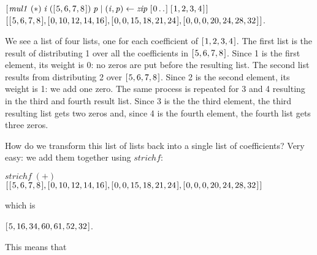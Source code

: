 \documentclass[tikz]{scrreprt}
\newcommand{\Varid}[1]{\mathit{#1}}
\begin{document}
\ensuremath{[\mskip1.5mu \Varid{mul1}\;(\mathbin{*})\;\Varid{i}\;([\mskip1.5mu \mathrm{5},\mathrm{6},\mathrm{7},\mathrm{8}\mskip1.5mu])\;\Varid{p}\mid (\Varid{i},\Varid{p})\leftarrow \Varid{zip}\;[\mskip1.5mu \mathrm{0}\mathinner{\ldotp\ldotp}\mskip1.5mu]\;[\mskip1.5mu \mathrm{1},\mathrm{2},\mathrm{3},\mathrm{4}\mskip1.5mu]\mskip1.5mu]}\\
\ensuremath{[\mskip1.5mu [\mskip1.5mu \mathrm{5},\mathrm{6},\mathrm{7},\mathrm{8}\mskip1.5mu],[\mskip1.5mu \mathrm{0},\mathrm{10},\mathrm{12},\mathrm{14},\mathrm{16}\mskip1.5mu],[\mskip1.5mu \mathrm{0},\mathrm{0},\mathrm{15},\mathrm{18},\mathrm{21},\mathrm{24}\mskip1.5mu],[\mskip1.5mu \mathrm{0},\mathrm{0},\mathrm{0},\mathrm{20},\mathrm{24},\mathrm{28},\mathrm{32}\mskip1.5mu]\mskip1.5mu]}.

We see a list of four lists, 
one for each coefficient of \ensuremath{[\mskip1.5mu \mathrm{1},\mathrm{2},\mathrm{3},\mathrm{4}\mskip1.5mu]}.
The first list is the result of distributing 1 
over all the coefficients in \ensuremath{[\mskip1.5mu \mathrm{5},\mathrm{6},\mathrm{7},\mathrm{8}\mskip1.5mu]}.
Since 1 is the first element,
its weight is 0: no zeros are put before the resulting list.
The second list results from distributing 2 over \ensuremath{[\mskip1.5mu \mathrm{5},\mathrm{6},\mathrm{7},\mathrm{8}\mskip1.5mu]}.
Since 2 is the second element, its weight is 1:
we add one zero.
The same process is repeated for 3 and 4 resulting
in the third and fourth result list.
Since 3 is the the third element, the third resulting list
gets two zeros and, since 4 is the fourth element,
the fourth list gets three zeros.

How do we transform this list of lists back
into a single list of coefficients? Very easy:
we add them together using \ensuremath{\Varid{strichf}}:

\ensuremath{\Varid{strichf}\;(\mathbin{+})}
\ensuremath{[\mskip1.5mu [\mskip1.5mu \mathrm{5},\mathrm{6},\mathrm{7},\mathrm{8}\mskip1.5mu],[\mskip1.5mu \mathrm{0},\mathrm{10},\mathrm{12},\mathrm{14},\mathrm{16}\mskip1.5mu],[\mskip1.5mu \mathrm{0},\mathrm{0},\mathrm{15},\mathrm{18},\mathrm{21},\mathrm{24}\mskip1.5mu],[\mskip1.5mu \mathrm{0},\mathrm{0},\mathrm{0},\mathrm{20},\mathrm{24},\mathrm{28},\mathrm{32}\mskip1.5mu]\mskip1.5mu]}

which is

\ensuremath{[\mskip1.5mu \mathrm{5},\mathrm{16},\mathrm{34},\mathrm{60},\mathrm{61},\mathrm{52},\mathrm{32}\mskip1.5mu]}.

This means that
\end{document}
